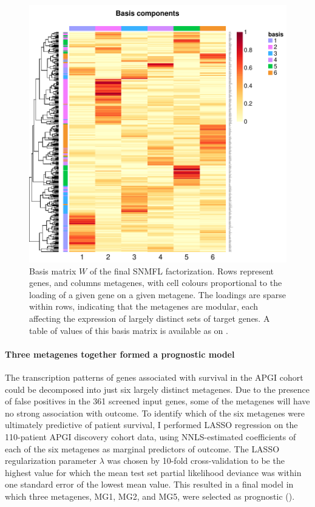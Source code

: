 \documentclass[dissertation.tex]{subfiles}
\begin{document}
\begin{figure}[!htbp]
\centering
\includegraphics[width=.7\linewidth]{analysis/biosurv/reports/18_SIS_diag_dsd_final/figure/nmf-plots-2}
\caption[Basis matrix \texorpdfstring{$W$}{W} of the final \texorpdfstring{\acrshort{SNMFL}}{SNMF/L} factorization]{Basis matrix $W$ of the final \acrshort{SNMFL} factorization.  Rows represent genes, and columns metagenes, with cell colours proportional to the loading of a given gene on a given metagene.  The loadings are sparse within rows, indicating that the metagenes are modular, each affecting the expression of largely distinct sets of target genes.  A table of values of this basis matrix is available as  on .}\label{fig:sigs-nmf-basis}
\end{figure}

\paragraph{Three metagenes together formed a prognostic model}
The transcription patterns of genes associated with survival in the \gls{APGI} cohort could be decomposed into just six largely distinct metagenes.  Due to the presence of false positives in the 361 screened input genes, some of the metagenes will have no strong association with outcome.  To identify which of the six metagenes were ultimately predictive of patient survival, I performed \gls{LASSO} regression on the 110-patient \gls{APGI} discovery cohort data, using \gls{NNLS}-estimated coefficients of each of the six metagenes as marginal predictors of outcome.  The \gls{LASSO} regularization parameter $\lambda$ was chosen by 10-fold cross-validation to be the highest value for which the mean test set partial likelihood deviance was within one standard error of the lowest mean value.  This resulted in a final model in which three metagenes, MG1, MG2, and MG5, were selected as prognostic ().
\end{document}
